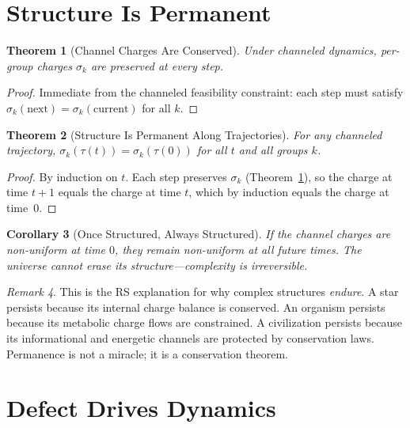 \documentclass[11pt,a4paper]{article}
\theoremstyle{plain}
\newtheorem{theorem}{Theorem}[section]
\newtheorem{corollary}[theorem]{Corollary}
\theoremstyle{definition}
\theoremstyle{remark}
\newtheorem{remark}[theorem]{Remark}
\begin{document}
\section{Structure Is Permanent}\label{sec:permanence}

\begin{theorem}[Channel Charges Are Conserved]\label{thm:conserved}
Under channeled dynamics, per-group charges $\sigma_k$ are preserved at every step.
\end{theorem}

\begin{proof}
Immediate from the channeled feasibility constraint: each step must satisfy $\sigma_k(\text{next}) = \sigma_k(\text{current})$ for all $k$.
\end{proof}

\begin{theorem}[Structure Is Permanent Along Trajectories]\label{thm:permanent}
For any channeled trajectory, $\sigma_k(\tau(t)) = \sigma_k(\tau(0))$ for all $t$ and all groups $k$.
\end{theorem}

\begin{proof}
By induction on $t$.
Each step preserves $\sigma_k$ (Theorem~\ref{thm:conserved}), so the charge at time $t{+}1$ equals the charge at time $t$, which by induction equals the charge at time~$0$.
\end{proof}

\begin{corollary}[Once Structured, Always Structured]
If the channel charges are non-uniform at time $0$, they remain non-uniform at all future times.
The universe cannot erase its structure---complexity is irreversible.
\end{corollary}

\begin{remark}
This is the RS explanation for why complex structures \emph{endure}.
A star persists because its internal charge balance is conserved.
An organism persists because its metabolic charge flows are constrained.
A civilization persists because its informational and energetic channels are protected by conservation laws.
Permanence is not a miracle; it is a conservation theorem.
\end{remark}

\section{Defect Drives Dynamics}\label{sec:dynamics}
\end{document}
